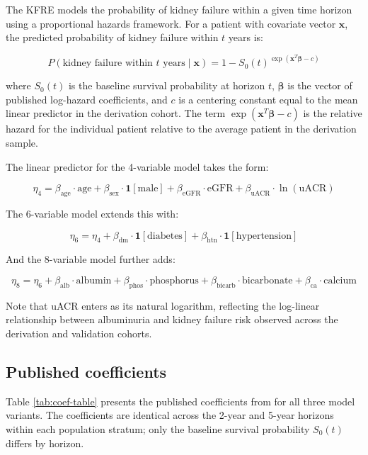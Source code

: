 The KFRE models the probability of kidney failure within a given time horizon
using a proportional hazards framework. For a patient with covariate vector
\(\mathbf{x}\), the predicted probability of kidney failure within \(t\) years is:

\[
P(\text{kidney failure within } t \text{ years} \mid \mathbf{x}) =
1 - S_0(t)^{\exp(\mathbf{x}^T \boldsymbol{\beta} - c)}
\]

where \(S_0(t)\) is the baseline survival probability at horizon \(t\),
\(\boldsymbol{\beta}\) is the vector of published log-hazard coefficients,
and \(c\) is a centering constant equal to the mean linear predictor in the
derivation cohort. The term \(\exp(\mathbf{x}^T \boldsymbol{\beta} - c)\)
is the relative hazard for the individual patient relative to the average
patient in the derivation sample.

The linear predictor for the 4-variable model takes the form:

\[
\eta_4 = \beta_{\text{age}} \cdot \text{age} +
          \beta_{\text{sex}} \cdot \mathbf{1}[\text{male}] +
          \beta_{\text{eGFR}} \cdot \text{eGFR} +
          \beta_{\text{uACR}} \cdot \ln(\text{uACR})
\]

The 6-variable model extends this with:

\[
\eta_6 = \eta_4 +
          \beta_{\text{dm}} \cdot \mathbf{1}[\text{diabetes}] +
          \beta_{\text{htn}} \cdot \mathbf{1}[\text{hypertension}]
\]

And the 8-variable model further adds:

\[
\eta_8 = \eta_6 +
          \beta_{\text{alb}} \cdot \text{albumin} +
          \beta_{\text{phos}} \cdot \text{phosphorus} +
          \beta_{\text{bicarb}} \cdot \text{bicarbonate} +
          \beta_{\text{ca}} \cdot \text{calcium}
\]

Note that uACR enters as its natural logarithm, reflecting the
log-linear relationship between albuminuria and kidney failure risk
observed across the derivation and validation cohorts.

\subsection{Published coefficients}\label{published-coefficients}

Table \ref{tab:coef-table} presents the published coefficients from
\citet{tangri2016} for all three model variants. The coefficients are identical
across the 2-year and 5-year horizons within each population stratum;
only the baseline survival probability \(S_0(t)\) differs by horizon.

